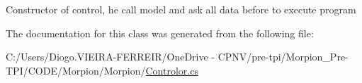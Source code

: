 Constructor of control, he call model and ask all data before to execute program 



The documentation for this class was generated from the following file\+:\begin{DoxyCompactItemize}
\item 
C\+:/\+Users/\+Diogo.\+V\+I\+E\+I\+R\+A-\/\+F\+E\+R\+R\+E\+I\+R/\+One\+Drive -\/ C\+P\+N\+V/pre-\/tpi/\+Morpion\+\_\+\+Pre-\/\+T\+P\+I/\+C\+O\+D\+E/\+Morpion/\+Morpion/\hyperlink{_controlor_8cs}{Controlor.\+cs}\end{DoxyCompactItemize}
